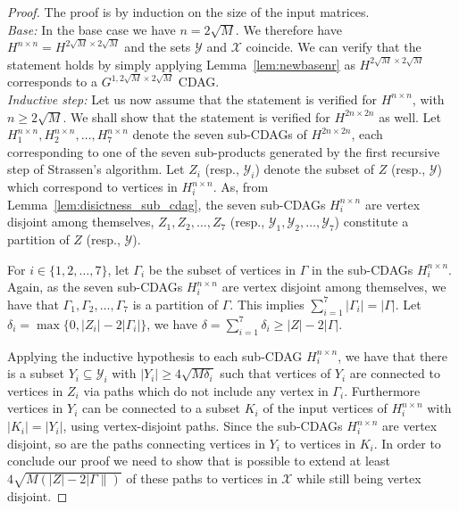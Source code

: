\documentclass[a4paper,UKenglish]{lipics-v2016}
\begin{document}
\begin{proof}
	The proof is by induction on the size of the input matrices.\\
\emph{Base:} In the base case we have $n = 2\sqrt{M}$. We therefore
have $H^{n\times n} = H^{2\sqrt{M}\times 2\sqrt{M}}$ and the sets
$\mathcal{Y}$ and $\mathcal{X}$ coincide. We can verify that the
statement holds by simply applying Lemma~\ref{lem:newbasenr} as
$H^{2\sqrt{M}\times 2\sqrt{M}}$ corresponds to a $G^{1,2\sqrt{M}\times
  2\sqrt{M}}$ CDAG.\\
\emph{Inductive step:} Let us now assume that the statement is
verified for $H^{n\times n}$, with $n\geq 2\sqrt{M}$. We shall show
that the statement is verified for $H^{2n\times 2n}$ as well.  Let
$H^{n\times n}_1,H^{n\times n}_2,\ldots,H^{n\times n}_7$ denote the
seven sub-CDAGs of $H^{2n\times 2n}$, each corresponding to one of the
seven sub-products generated by the first recursive step of Strassen's
algorithm. Let $Z_i$ (resp., $\mathcal{Y}_i$) denote the subset of $Z$
(resp., $\mathcal{Y}$) which correspond to vertices in $H^{n\times
  n}_i$. As, from Lemma~\ref{lem:disictness_sub_cdag}, the seven
sub-CDAGs $H^{n\times n}_i$ are vertex disjoint among themselves,
$Z_1,Z_2,\ldots,Z_7$ (resp., $\mathcal{Y}_1,\mathcal{Y}_2,\ldots,
\mathcal{Y}_7$) constitute a partition of $Z$ (resp., $\mathcal{Y}$).

For $i\in \{1,2,\ldots,7\}$, let $\Gamma_i$ be the subset of vertices in $\Gamma$ in the sub-CDAGs $H^{n\times n}_i$. Again, as the seven sub-CDAGs $H^{n\times n}_i$ are vertex disjoint among themselves, we have that $\Gamma_1,\Gamma_2,\ldots,\Gamma_7$ is a partition of $\Gamma$.  This implies $\sum_{i=1}^7 |\Gamma_i| = |\Gamma|$. Let $\delta_i = \max\{0, |Z_i|-2|\Gamma_i|\}$, we have $\delta = \sum_{i=1}^7 \delta_i \geq |Z| - 2|\Gamma|$. 
	
	Applying the inductive hypothesis to each sub-CDAG $H^{n\times n}_i$, we have that there is a subset $Y_i\subseteq \mathcal{Y}_i$ with $|Y_i|\geq 4\sqrt{M\delta_i}$ such that vertices of $Y_i$ are connected  to vertices in $Z_i$ via paths which do not include any vertex in $\Gamma_i$. Furthermore vertices in $Y_i$ can be connected to a subset $K_i$ of the input vertices of $H^{n\times n}_i$ with $|K_i|=|Y_i|$, using vertex-disjoint paths. Since the sub-CDAGs $H^{n\times n}_i$ are vertex disjoint, so are the paths connecting vertices in $Y_i$ to vertices in $K_i$. In order to conclude our proof we need to show that is possible to extend at least $4\sqrt{M\left(|Z|-2|\Gamma\|\right)}$ of these paths to vertices in $\mathcal{X}$ while still being vertex disjoint. 
	

\end{proof}
\end{document}
